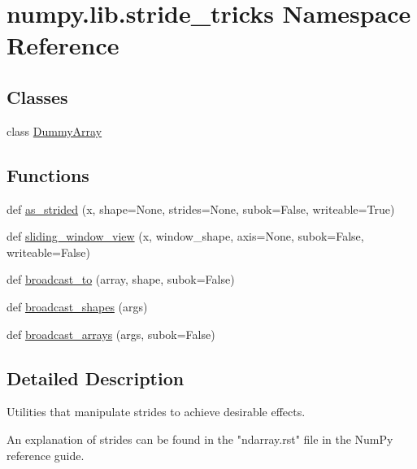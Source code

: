 \hypertarget{namespacenumpy_1_1lib_1_1stride__tricks}{}\section{numpy.\+lib.\+stride\+\_\+tricks Namespace Reference}
\label{namespacenumpy_1_1lib_1_1stride__tricks}
\subsection*{Classes}
\begin{DoxyCompactItemize}
\item 
class \hyperlink{classnumpy_1_1lib_1_1stride__tricks_1_1DummyArray}{Dummy\+Array}
\end{DoxyCompactItemize}
\subsection*{Functions}
\begin{DoxyCompactItemize}
\item 
def \hyperlink{namespacenumpy_1_1lib_1_1stride__tricks_af0c7c89efa922680a51a6e861fc2628f}{as\+\_\+strided} (x, shape=None, strides=None, subok=False, writeable=True)
\item 
def \hyperlink{namespacenumpy_1_1lib_1_1stride__tricks_ad0af4109ea1a6f5614172e5d06f47934}{sliding\+\_\+window\+\_\+view} (x, window\+\_\+shape, axis=None, subok=False, writeable=False)
\item 
def \hyperlink{namespacenumpy_1_1lib_1_1stride__tricks_a7c24abd99f5e1487018c2217209be0d3}{broadcast\+\_\+to} (array, shape, subok=False)
\item 
def \hyperlink{namespacenumpy_1_1lib_1_1stride__tricks_ad084aae79f1d012a9faf77d6db2343e2}{broadcast\+\_\+shapes} (args)
\item 
def \hyperlink{namespacenumpy_1_1lib_1_1stride__tricks_a0819d44b8262c334f381ed9b9fe1449f}{broadcast\+\_\+arrays} (args, subok=False)
\end{DoxyCompactItemize}


\subsection{Detailed Description}
\begin{DoxyVerb}Utilities that manipulate strides to achieve desirable effects.

An explanation of strides can be found in the "ndarray.rst" file in the
NumPy reference guide.\end{DoxyVerb}
 

